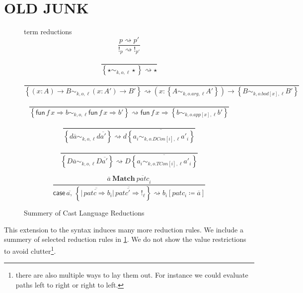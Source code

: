 
\section{OLD JUNK}





\begin{figure}

term reductions
\[
\frac{p\rightsquigarrow p'}{!_{p}\rightsquigarrow!_{p'}}
\]


\[
\frac{\,}{\left\{ \star\sim_{k,o,\ell}\star\right\} \rightsquigarrow\star}
\]

\[
\frac{\,}{\left\{ \left(x:A\right)\rightarrow B\sim_{k,o,\ell}\left(x:A'\right)\rightarrow B'\right\} \rightsquigarrow\left(x:\left\{ A\sim_{k,o.arg,\ell}A'\right\} \right)\rightarrow\left\{ B\sim_{k,o.bod\left[x\right],\ell}B'\right\} }
\]

\[
\frac{\,}{\left\{ \mathsf{fun}\,f\,x\Rightarrow b\sim_{k,o,\ell}\mathsf{fun}\,f\,x\Rightarrow b'\right\} \rightsquigarrow\mathsf{fun}\,f\,x\Rightarrow\left\{ b\sim_{k,o.app\left[x\right],\ell}b'\right\} }
\]

\[
\frac{\,}{\left\{ d\overline{a}\sim_{k,o,\ell}d\overline{a'}\right\} \rightsquigarrow d\overline{\left\{ a_{i}\sim_{k,o.DCon[i],\ell}a'_{i}\right\} }}
\]

\[
\frac{\,}{\left\{ D\overline{a}\sim_{k,o,\ell}D\overline{a'}\right\} \rightsquigarrow D\overline{\left\{ a_{i}\sim_{k,o.TCon[i],\ell}a'_{i}\right\} }}
\]


\[
\frac{\overline{a}\ \mathbf{Match}\ \overline{patc}_{i}}{\mathsf{case}\,\overline{a,}\,\left\{ \overline{|\,\overline{patc\Rightarrow}b_{i}}\overline{|\,\overline{patc'\Rightarrow}!_{\ell}}\right\} \rightsquigarrow b_{i}\left[patc_{i}\coloneqq\overline{a}\right]}
\]

\caption{Summery of Cast Language Reductions}
\label{fig:cast-data-red}
\end{figure}

This extension to the syntax induces many more reduction rules. We
include a summery of selected reduction rules in \ref{fig:cast-data-red}.
We do not show the value restrictions to avoid clutter\footnote{there are also multiple ways to lay them out. For instance we could
evaluate paths left to right or right to left.}. 


